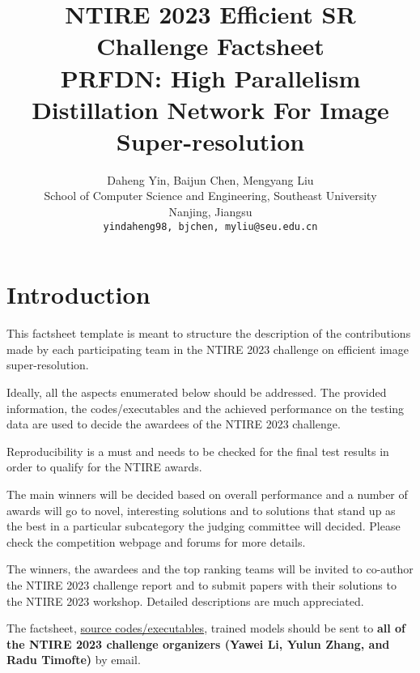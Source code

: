 \documentclass[10pt,twocolumn,letterpaper]{article}
\begin{document}
\title{NTIRE 2023 Efficient SR Challenge Factsheet\\PRFDN: High Parallelism Distillation Network For Image Super-resolution}

\author{Daheng Yin, Baijun Chen, Mengyang Liu\\
School of Computer Science and Engineering, Southeast University\\
Nanjing, Jiangsu\\
{\tt\small {yindaheng98, bjchen, myliu}@seu.edu.cn}
}
\maketitle

\section{Introduction}

This factsheet template is meant to structure the description of the contributions made by each participating team in the NTIRE 2023 challenge on efficient image super-resolution. 

Ideally, all the aspects enumerated below should be addressed.
The provided information, the codes/executables and the achieved performance on the testing data are used to decide the awardees of the NTIRE 2023 challenge. 

Reproducibility is a must and needs to be checked for the final test results in order to qualify for the NTIRE awards. 

The main winners will be decided based on overall performance and a number of awards will go to novel, interesting solutions and to solutions that stand up as the best in a particular subcategory the judging committee will decided. Please check the competition webpage and forums for more details.

The winners, the awardees and the top ranking teams will be invited to co-author the NTIRE 2023 challenge report and to submit papers with their solutions to the NTIRE 2023 workshop. Detailed descriptions are much appreciated.

The factsheet, \href{https://github.com/ofsoundof/NTIRE2023_ESR}{source codes/executables}, trained models should be sent to \textbf{all of the NTIRE 2023 challenge organizers (Yawei Li, Yulun Zhang, and Radu Timofte)} by email.
\end{document}
